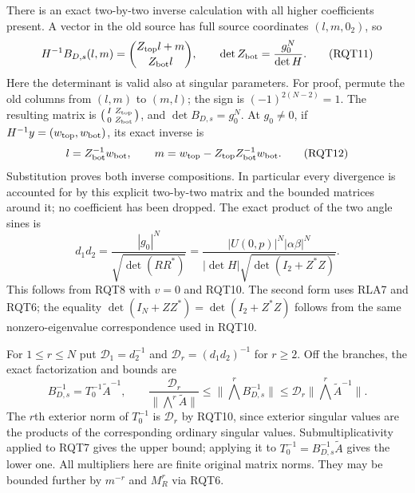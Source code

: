 There is an exact two-by-two inverse calculation with all higher
coefficients present.  A vector in the old source has full source
coordinates $(l,m,0_2)$, so
\[
 H^{-1}B_{D,s}(l,m)=\binom{Z_{\rm top}l+m}{Z_{\rm bot}l},\qquad
 \det Z_{\rm bot}=\frac{g_0^N}{\det H}.
 \tag{RQT11}
\]
Here the determinant is valid also at singular parameters.
For proof, permute the old columns from $(l,m)$ to $(m,l)$;
the sign is $(-1)^{2(N-2)}=1$.  The resulting matrix is
$\bigl(\begin{smallmatrix}I&Z_{\rm top}\\0&Z_{\rm bot}\end{smallmatrix}\bigr)$,
and $\det B_{D,s}=g_0^N$.  At $g_0\ne0$, if
$H^{-1}y=(w_{\rm top},w_{\rm bot})$, its exact inverse is
\[
 l=Z_{\rm bot}^{-1}w_{\rm bot},\qquad
 m=w_{\rm top}-Z_{\rm top}Z_{\rm bot}^{-1}w_{\rm bot}.
 \tag{RQT12}
\]
Substitution proves both inverse compositions.  In particular
every divergence is accounted for by this explicit two-by-two
matrix and the bounded matrices around it; no coefficient has
been dropped.  The exact product of the two angle sines is
\[
 d_1d_2=\frac{|g_0|^N}{\sqrt{\det(RR^*)}}
 =\frac{|U(0,p)|^N|\alpha\beta|^N}
 {|\det H|\sqrt{\det(I_2+Z^*Z)}}.
 \tag{RQT13}
\]
This follows from RQT8 with $v=0$ and RQT10.  The second form
uses RLA7 and RQT6; the equality
$\det(I_N+ZZ^*)=\det(I_2+Z^*Z)$ follows from the same
nonzero-eigenvalue correspondence used in RQT10.

For $1\le r\le N$ put $\mathcal D_1=d_2^{-1}$ and
$\mathcal D_r=(d_1d_2)^{-1}$ for $r\ge2$.
Off the branches, the exact factorization and bounds are
\[
 B_{D,s}^{-1}=T_0^{-1}\widetilde A^{-1},\qquad
 \frac{\mathcal D_r}{\|\bigwedge^r\widetilde A\|}
 \le\|\bigwedge^r B_{D,s}^{-1}\|
 \le\mathcal D_r\|\bigwedge^r\widetilde A^{-1}\|.
 \tag{RQT14}
\]
The $r$th exterior norm of $T_0^{-1}$ is $\mathcal D_r$ by
RQT10, since exterior singular values are the products of the
corresponding ordinary singular values.  Submultiplicativity
applied to RQT7 gives the upper bound; applying it to
$T_0^{-1}=B_{D,s}^{-1}\widetilde A$ gives the lower one.
All multipliers here are finite original matrix norms.  They
may be bounded further by $m^{-r}$ and $M_R^r$ via RQT6.

